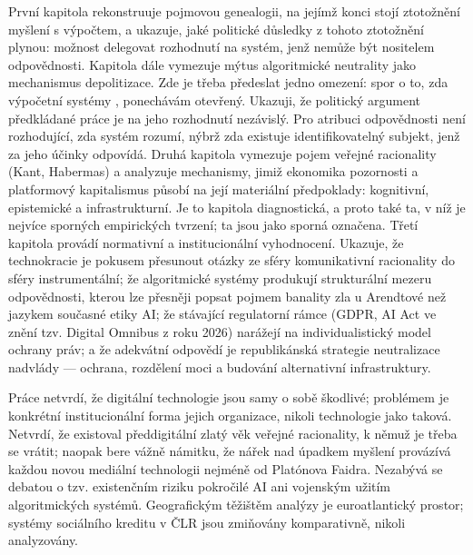 První kapitola rekonstruuje pojmovou genealogii, na jejímž konci stojí ztotožnění myšlení s výpočtem, a ukazuje, jaké politické důsledky z tohoto ztotožnění plynou: možnost delegovat rozhodnutí na systém, jenž nemůže být nositelem odpovědnosti.
Kapitola dále vymezuje mýtus algoritmické neutrality jako mechanismus depolitizace.
Zde je třeba předeslat jedno omezení: spor o to, zda výpočetní systémy , ponechávám otevřený. Ukazuji, že politický argument předkládané práce je na jeho rozhodnutí nezávislý. Pro atribuci odpovědnosti není rozhodující, zda systém rozumí, nýbrž zda existuje identifikovatelný subjekt, jenž za jeho účinky odpovídá.
Druhá kapitola vymezuje pojem veřejné racionality (Kant, Habermas) a analyzuje mechanismy, jimiž ekonomika pozornosti a platformový kapitalismus působí na její materiální předpoklady: kognitivní, epistemické a infrastrukturní.
Je to kapitola diagnostická, a proto také ta, v níž je nejvíce sporných empirických tvrzení; ta jsou jako sporná označena.
Třetí kapitola provádí normativní a institucionální vyhodnocení. Ukazuje, že technokracie je pokusem přesunout otázky ze sféry komunikativní racionality do sféry instrumentální; že algoritmické systémy produkují strukturální mezeru odpovědnosti, kterou lze přesněji popsat pojmem banality zla u Arendtové než jazykem současné etiky AI;
že stávající regulatorní rámce (GDPR, AI Act ve znění tzv. Digital Omnibus z roku 2026) narážejí na individualistický model ochrany práv; a že adekvátní odpovědí je republikánská strategie neutralizace nadvlády — ochrana, rozdělení moci a budování alternativní infrastruktury.



Práce netvrdí, že digitální technologie jsou samy o sobě škodlivé; problémem je konkrétní institucionální forma jejich organizace, nikoli technologie jako taková.
Netvrdí, že existoval předdigitální zlatý věk veřejné racionality, k němuž je třeba se vrátit; naopak bere vážně námitku, že nářek nad úpadkem myšlení provázívá každou novou mediální technologii nejméně od Platónova Faidra.
Nezabývá se debatou o tzv. existenčním riziku pokročilé AI ani vojenským užitím algoritmických systémů.
Geografickým těžištěm analýzy je euroatlantický prostor; systémy sociálního kreditu v ČLR jsou zmiňovány komparativně, nikoli analyzovány.
